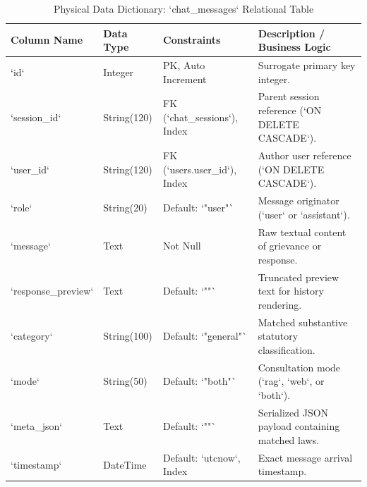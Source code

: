\begin{table}[H]
\caption{Physical Data Dictionary: `chat_messages` Relational Table}
\label{tab:schema_messages}
\centering
\small
\begin{tabularx}{\textwidth}{lp{2.8cm}p{2.5cm}X}
\toprule
\textbf{Column Name} & \textbf{Data Type} & \textbf{Constraints} & \textbf{Description / Business Logic} \\
\midrule
`id` & Integer & PK, Auto Increment & Surrogate primary key integer. \\
`session_id` & String(120) & FK (`chat_sessions`), Index & Parent session reference (`ON DELETE CASCADE`). \\
`user_id` & String(120) & FK (`users.user_id`), Index & Author user reference (`ON DELETE CASCADE`). \\
`role` & String(20) & Default: `"user"` & Message originator (`user` or `assistant`). \\
`message` & Text & Not Null & Raw textual content of grievance or response. \\
`response_preview`& Text & Default: `""` & Truncated preview text for history rendering. \\
`category` & String(100) & Default: `"general"` & Matched substantive statutory classification. \\
`mode` & String(50) & Default: `"both"` & Consultation mode (`rag`, `web`, or `both`). \\
`meta_json` & Text & Default: `"{}"` & Serialized JSON payload containing matched laws. \\
`timestamp` & DateTime & Default: `utcnow`, Index & Exact message arrival timestamp. \\
\bottomrule
\end{tabularx}
\end{table}

